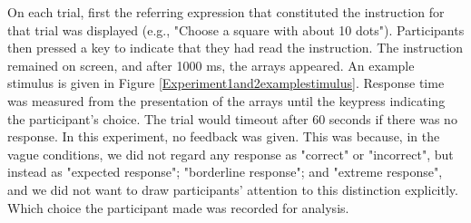 On each trial, first the referring expression that constituted the instruction for that trial was displayed (e.g., "Choose a square with about 10 dots"). Participants then pressed a key to indicate that they had read the instruction. The instruction remained on screen, and after 1000 ms, the arrays appeared. An example stimulus is given in Figure \ref{Experiment1and2examplestimulus}. Response time was measured from the presentation of the arrays until the keypress indicating the participant's choice. The trial would timeout after 60 seconds if there was no response. In this experiment, no feedback was given. This was because, in the vague conditions, we did not regard any response as "correct" or "incorrect", but instead as "expected response"; "borderline response"; and "extreme response", and we did not want to draw participants' attention to this distinction explicitly. Which choice the participant made was recorded for analysis.

